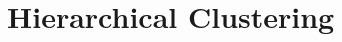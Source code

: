 \documentclass[aspectratio=169,usenames,dvipsnames]{beamer}
\newcommand{\InstructorList}[1]{
\begin{itemize}
	\color{orange}
	#1
\end{itemize}
}
\begin{document}



















\section{Hierarchical Clustering}
\end{document}
